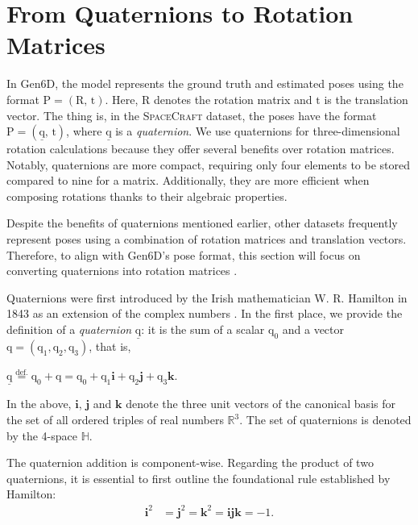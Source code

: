 \section{From Quaternions to Rotation Matrices}

In Gen6D, the model represents the ground truth and estimated poses using the format ${\bm{\mathrm{P}}}=(\bm{\mathrm{R}},\,\bm{\mathrm{t}})$. Here, $\bm{\mathrm{R}}$ denotes the rotation matrix and $\bm{\mathrm{t}}$ is the translation vector.
The thing is, in the \textsc{SpaceCraft} dataset, the poses have the format ${\bm{\mathrm{P}}}=(\underline{\bm{\mathrm{q}}},\,\bm{\mathrm{t}})$, where $\underline{\bm{\mathrm{q}}}$ is a \textit{quaternion}. We use quaternions for three-dimensional rotation calculations because they offer several benefits over rotation matrices. Notably, quaternions are more compact, requiring only four elements to be stored compared to nine for a matrix. Additionally, they are more efficient when composing rotations thanks to their algebraic properties.

Despite the benefits of quaternions mentioned earlier, other datasets frequently represent poses using a combination of rotation matrices and translation vectors. Therefore, to align with Gen6D's pose format, this section will focus on converting quaternions into rotation matrices \cite{jia2022quaternions}.

\bigbreak 

Quaternions were first introduced by the Irish mathematician W. R. Hamilton in 1843 as an extension of the complex numbers \cite{Hamilton1866}. In the first place, we provide the definition of a \textit{quaternion} $\underline{\bm{\mathrm{q}}}$: it is the sum of a scalar $\mathrm{q}_0$ and a vector $\bm{\mathrm{q}}=(\mathrm{q}_1, \mathrm{q}_2, \mathrm{q}_3)$, that is,
\begin{center}
	$\underline{\bm{\mathrm{q}}} \stackrel{\text{def.}}{=} \mathrm{q}_0 + \bm{\mathrm{q}} = \mathrm{q}_0 + \mathrm{q}_1\bm{i} + \mathrm{q}_2\bm{j} + \mathrm{q}_3\bm{k}$.
\end{center}

\noindent In the above, $\bm{i}$, $\bm{j}$ and $\bm{k}$ denote the three unit vectors of the canonical basis for 
the set of all ordered triples of real numbers $\mathbb{R}^3$. The set of quaternions is denoted by the 4-space $\mathbb{H}$.

\bigbreak 
The quaternion addition is component-wise. Regarding the product of two quaternions, it is essential to first outline the foundational rule established by \mbox{Hamilton}:
\begin{align*}
	\bm{i}^2 &= \bm{j}^2 = \bm{k}^2 = \bm{ijk}= -1.
\end{align*}

